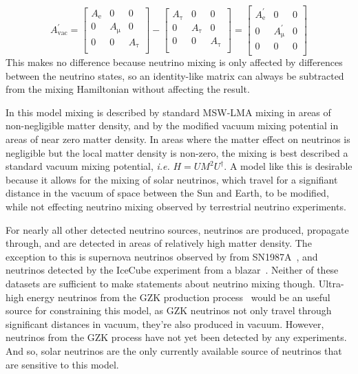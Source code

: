 \begin{equation}
A_{\mathrm{vac}}^{\prime} =
\begin{bmatrix}
    A_{\mathrm{e}} & 0 & 0  \\
    0 &  A_{\mathrm{\mu}} & 0  \\
    0 & 0 &  A_{\mathrm{\tau}}  \\
\end{bmatrix} - 
\begin{bmatrix}
    A_{\mathrm{\tau}} & 0 & 0  \\
    0 &  A_{\mathrm{\tau}} & 0  \\
    0 & 0 &  A_{\mathrm{\tau}}  \\ 
\end{bmatrix} 
= 
\begin{bmatrix}
    A_{\mathrm{e}}^{\prime} & 0 & 0  \\
    0 &  A_{\mathrm{\mu}}^{\prime} & 0  \\
    0 & 0 &  0  \\ 
\end{bmatrix}  
\end{equation}
This makes no difference because neutrino mixing is only affected by differences
between the neutrino states, so an identity-like matrix can always be subtracted
from the mixing Hamiltonian without affecting the result.

In this model mixing is described by standard MSW-LMA mixing in areas of
non-negligible matter density, and by the modified vacuum mixing potential
in areas of near zero matter density.
In areas where the matter effect on neutrinos is negligible but the local
matter density is non-zero, the mixing is best described a standard
vacuum mixing potential, \textit{i.e.} $H = UM^{2}U^{\dagger}$.
A model like this is desirable because it allows for the mixing of solar neutrinos, which
travel for a signifiant distance in the vacuum of space between the Sun and Earth,
to be modified, while not effecting neutrino mixing observed by terrestrial neutrino experiments.

For nearly all other detected neutrino sources, neutrinos are produced, propagate through,
and are detected in areas of relatively high matter density.
The exception to this is supernova neutrinos observed by from SN1987A~\citep{kamiokande_sn, imb_sn, baksan_sn},
and neutrinos detected by the IceCube experiment from a blazar~\citep{icecube_blazar}.
Neither of these datasets are sufficient to make statements
about neutrino mixing though.
Ultra-high energy neutrinos from the GZK production process~\citep{gzk} would be an useful
source for constraining this model, as GZK neutrinos not only travel through
significant distances in vacuum, they're also produced in vacuum.
However, neutrinos from the GZK process have not yet been detected by
any experiments.
And so, solar neutrinos are the only currently available source
of neutrinos that are sensitive to this model.

